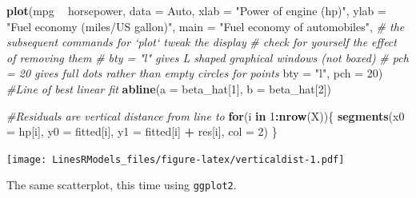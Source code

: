 \documentclass[]{book}
\newenvironment{Shaded}{\begin{snugshade}}{\end{snugshade}}
\newcommand{\KeywordTok}[1]{\textcolor[rgb]{0.13,0.29,0.53}{\textbf{#1}}}
\newcommand{\DataTypeTok}[1]{\textcolor[rgb]{0.13,0.29,0.53}{#1}}
\newcommand{\DecValTok}[1]{\textcolor[rgb]{0.00,0.00,0.81}{#1}}
\newcommand{\StringTok}[1]{\textcolor[rgb]{0.31,0.60,0.02}{#1}}
\newcommand{\CommentTok}[1]{\textcolor[rgb]{0.56,0.35,0.01}{\textit{#1}}}
\newcommand{\ControlFlowTok}[1]{\textcolor[rgb]{0.13,0.29,0.53}{\textbf{#1}}}
\newcommand{\OperatorTok}[1]{\textcolor[rgb]{0.81,0.36,0.00}{\textbf{#1}}}
\newcommand{\NormalTok}[1]{#1}
\theoremstyle{definition}
\theoremstyle{definition}
\theoremstyle{definition}
\theoremstyle{remark}
\begin{document}
\begin{Shaded}
\begin{Highlighting}[]
\KeywordTok{plot}\NormalTok{(mpg }\OperatorTok{~}\StringTok{ }\NormalTok{horsepower,  }\DataTypeTok{data =}\NormalTok{ Auto, }
     \DataTypeTok{xlab =} \StringTok{"Power of engine (hp)"}\NormalTok{, }
     \DataTypeTok{ylab =} \StringTok{"Fuel economy (miles/US gallon)"}\NormalTok{, }
     \DataTypeTok{main =} \StringTok{"Fuel economy of automobiles"}\NormalTok{,}
     \CommentTok{# the subsequent commands for `plot`  tweak the display}
     \CommentTok{# check for yourself the effect of removing them}
     \CommentTok{# bty = "l" gives L shaped graphical windows (not boxed)}
     \CommentTok{# pch = 20 gives full dots rather than empty circles for points}
     \DataTypeTok{bty =} \StringTok{"l"}\NormalTok{, }\DataTypeTok{pch =} \DecValTok{20}\NormalTok{) }
\CommentTok{#Line of best linear fit}
\KeywordTok{abline}\NormalTok{(}\DataTypeTok{a =}\NormalTok{ beta_hat[}\DecValTok{1}\NormalTok{], }\DataTypeTok{b =}\NormalTok{ beta_hat[}\DecValTok{2}\NormalTok{])}

\CommentTok{#Residuals are vertical distance from line to }
\ControlFlowTok{for}\NormalTok{(i }\ControlFlowTok{in} \DecValTok{1}\OperatorTok{:}\KeywordTok{nrow}\NormalTok{(X))\{}
  \KeywordTok{segments}\NormalTok{(}\DataTypeTok{x0 =}\NormalTok{ hp[i], }\DataTypeTok{y0 =}\NormalTok{ fitted[i], }\DataTypeTok{y1 =}\NormalTok{ fitted[i] }\OperatorTok{+}\StringTok{ }\NormalTok{res[i], }\DataTypeTok{col =} \DecValTok{2}\NormalTok{)}
\NormalTok{\}}
\end{Highlighting}
\end{Shaded}

\texttt{[image: LinesRModels\_files/figure-latex/verticaldist-1.pdf]}

The same scatterplot, this time using \texttt{ggplot2}.
\end{document}

